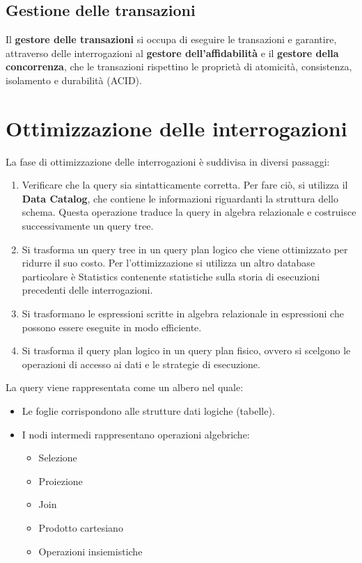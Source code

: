 \subsection{Gestione delle transazioni}
Il \textbf{gestore delle transazioni} si occupa di eseguire le transazioni e
garantire, attraverso delle interrogazioni al \textbf{gestore dell'affidabilità}
e il \textbf{gestore della concorrenza}, che le transazioni rispettino le
proprietà di atomicità, consistenza, isolamento e durabilità (ACID).
\section{Ottimizzazione delle interrogazioni}
La fase di ottimizzazione delle interrogazioni è suddivisa in diversi passaggi:
\begin{enumerate}
    \item Verificare che la query sia sintatticamente corretta. Per fare ciò,
          si utilizza il \textbf{Data Catalog}, che contiene le informazioni
          riguardanti la struttura dello schema.
          Questa operazione traduce la query in algebra relazionale e costruisce
          successivamente un query tree.
    \item Si trasforma un query tree in un query plan logico che viene ottimizzato
          per ridurre il suo costo. Per l'ottimizzazione si utilizza un altro
          database particolare è Statistics contenente statistiche sulla storia
          di esecuzioni precedenti delle interrogazioni.
    \item Si trasformano le espressioni scritte in algebra relazionale in
          espressioni che possono essere eseguite in modo efficiente.
    \item Si trasforma il query plan logico in un query plan fisico, ovvero
          si scelgono le operazioni di accesso ai dati e le strategie di
          esecuzione.
\end{enumerate}
\begin{definizione}
    La query viene rappresentata come un albero nel quale:
    \begin{itemize}
        \item Le foglie corrispondono alle strutture dati logiche (tabelle).
        \item I nodi intermedi rappresentano operazioni algebriche:
              \begin{itemize}
                  \item Selezione
                  \item Proiezione
                  \item Join
                  \item Prodotto cartesiano
                  \item Operazioni insiemistiche
              \end{itemize}
    \end{itemize}
\end{definizione}
